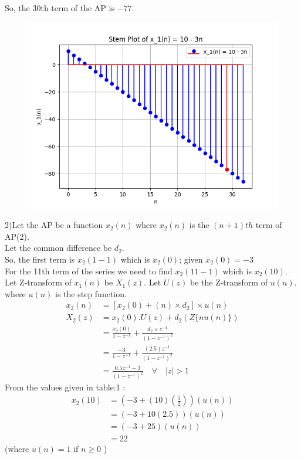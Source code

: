 \documentclass[journal,12pt,twocolumn]{IEEEtran}
\theoremstyle{remark}
\begin{document}
So, the 30th term of the AP is $-77$.\\
\begin{figure}[h!]
    \centering
    \includegraphics[width=\columnwidth]{figs/plot1.png}
    \label{fig:1}
\end{figure}

2)Let the AP be a function $x_2(n)$ where $x_2(n)$ is the $(n+1)th$ term of AP(2).\\
Let the common difference be $d_2$.\\
So, the first term is $x_2(1-1)$ which is $x_2(0)$; given $x_2(0) = -3$\\ 
For the 11th term of the series we need to find $x_2(11-1)$ which is $x_2(10)$.\\
Let Z-transform of $x_1(n)$ be $X_1(z)$. Let $U(z)$ be the Z-transform of $u(n)$.\\
where \(u(n)\) is the step function.
\begin{align}
x_2(n) &= [x_2(0) + (n) \times d_2 ]\times u(n)\\
X_2(z) &= x_2(0).U(z) + d_2(Z\{nu(n)\})\\
       &= \frac{x_2(0)}{1-z^{-1}} + \frac{d_2\times z^{-1}}{(1-z^{-1})^2}\\
       &= \frac{-3}{1-z^{-1}} + \frac{(2.5)z^{-1}}{(1-z^{-1})^2}\\
       &= \frac{0.5z^{-1}-3}{(1-z^{-1})^2} \quad \forall \quad |z| > 1
\end{align}
From the values given in table:1 :
\begin{align}
x_2(10) &= (-3 + (10)\left(\frac{5}{2}\right))(u(n))\\
&= (-3 + 10(2.5))(u(n))\\
& = (-3 + 25)(u(n)) \\
&= 22
\end{align}
(where $u(n) = 1$ if $n \geq 0$ )\\
\end{document}

